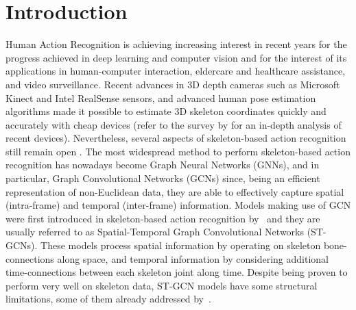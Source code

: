 \documentclass[review]{cvpr}
\begin{document}
\section{Introduction}
Human Action Recognition is achieving increasing interest in recent years for the progress achieved in deep learning and computer vision and for the interest of its applications in human-computer interaction, eldercare and healthcare assistance, and video surveillance. 
Recent advances in 3D depth cameras such as Microsoft Kinect \cite{zhang2012microsoft,robust-hand-gesture} and Intel RealSense \cite{Keselman_2017_CVPR_Workshops} sensors, and advanced human pose estimation algorithms \cite{openpose,multi-context} made it possible to estimate 3D skeleton coordinates quickly and accurately with cheap devices (refer to the survey by \cite{giancola2018survey} for an in-depth analysis of recent devices). 
Nevertheless, several aspects of skeleton-based action recognition still remain open \cite{a-comprehensive-survey,human-activity,a-survey}. 
The most widespread method to perform skeleton-based action recognition has nowadays become Graph Neural Networks (GNNs), and in particular, Graph Convolutional Networks (GCNs) since, being an efficient representation of non-Euclidean data, they are able to effectively capture spatial (intra-frame) and temporal  (inter-frame) information. Models making use of GCN were first introduced in skeleton-based action recognition by~\cite{yan2018spatial} and they are usually referred to as Spatial-Temporal Graph Convolutional Networks (ST-GCNs). These models process spatial information by operating on skeleton bone-connections along space, and temporal information by considering additional time-connections between each skeleton joint along time. Despite being proven to perform very well on skeleton data, ST-GCN models have some structural limitations, some of them already addressed by~\cite{dirgraph,2s-cnn,shift,disent}.
\end{document}

